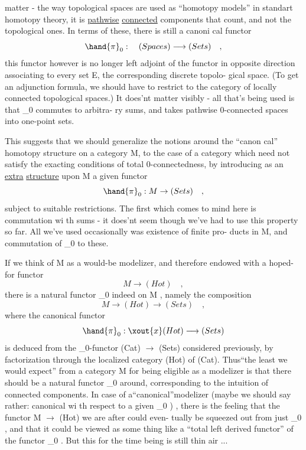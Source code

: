 matter -  the way topological spaces are used as ``homotopy models'' in
standart homotopy theory,  it is \uline{pathwise} \uline{connected} components that count,
and not the topological ones.  In terms of these,  there is still a canoni%
cal functor
\[ \hand{\pi}_0 : \quad (Spaces) \longrightarrow (Sets) \quad , \]
this functor however is no longer left adjoint of the functor in opposite
direction\hand{,} associating to every set E,  the corresponding discrete topolo-%
gical space. (To get an adjunction formula,  we should have to restrict
to the category of  locally connected topological spaces.)  It does'nt
matter  visibly  -  all that's being used is that \hand{\pi}_0 commutes to arbitra-%
ry sums,  and takes pathwise 0-connected spaces into one-point sets.

This suggests that we should generalize the notions around the ``canon%
cal'' homotopy structure on a category M,  to the case of a category which
need not satisfy the exacting conditions of total 0-connectedness,  by
introducing as an \uline{extra}  \uline{structure}  upon M  a given functor
\[ \hand{\pi}_0 : M \rightarrow (Sets) \quad , \]
subject  to suitable restrictions.  The first which comes to mind here is
commutation wi th sums  -  it does'nt seem though we've had to use this
property so far.  All we've used occasionally was existence of finite pro-%
ducts in M,  and commutation of \hand{\pi}_0 to these.

If we think of M as a would-be modelizer,  and therefore endowed with
a hoped-for functor
\[ M \longrightarrow (Hot) \quad , \]
there is a natural functor \hand{\pi}_0 indeed on M ,  namely the composition
\[ M \rightarrow (Hot) \longrightarrow (Sets) \quad , \]
where the canonical functor
\[ \hand{\pi}_0 :\xout{x}(Hot) \longrightarrow (Sets) \]
is deduced from the \hand{\pi}_0-functor (Cat) $\longrightarrow$ (Sets)  considered previously,
by factorization through the localized category (Hot) of (Cat).  Thus``the
least we would expect'' from a category M for being eligible as a modelizer\unsure{,}
is that there should be a natural functor \hand{\pi}_0 around,  corresponding to the
intuition of connected components.  In case of a``canonical''modelizer  
(maybe we should say rather:  canonical wi th respect to a given \hand{\pi}_0 ) ,
there is the feeling that the functor  M $\rightarrow$ (Hot)  we are after could even-%
tually be squeezed out from just \hand{\pi}_0 ,  and that it could be viewed as some%
thing like a ``total left derived functor'' of the functor \hand{\pi}_0 .  But this
for the time being is still thin air ...

